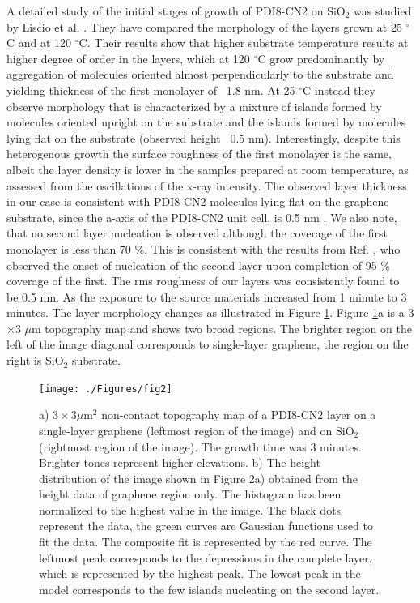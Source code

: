 \documentclass[preprint,aip,jap]{revtex4-2}
\begin{document}
 
A detailed study of the initial stages of growth of PDI8-CN2 on SiO$_{2}$ was studied by Liscio et al.
\cite{liscio-2013}.
 They have compared the morphology of the layers grown at 25 $^\circ$C and at 120 $^\circ$C.
 Their results show that higher substrate temperature results at higher degree of order in the layers, which at 120 $^\circ$C grow predominantly by aggregation of molecules oriented almost perpendicularly to the substrate and yielding thickness of the first monolayer of ~1.8 nm.
 At 25 $^\circ$C instead they observe morphology that is characterized by a mixture of islands formed by molecules oriented upright on the substrate and the islands formed by molecules lying flat on the substrate (observed height ~0.5 nm).
 Interestingly, despite this heterogenous growth the surface roughness of the first monolayer is the same, albeit the layer density is lower in the samples prepared at room temperature, as assessed from the oscillations of the x-ray intensity.
The observed layer thickness in our case is consistent with PDI8-CN2 molecules lying flat on the graphene substrate, since the a-axis of the PDI8-CN2 unit cell, is 0.5 nm \cite{liscio-2012}.
 We also note, that no second layer nucleation is observed although the coverage of the first monolayer is less than 70 \%.
 This is consistent with the results from Ref.
 , who observed the onset of nucleation of the second layer upon completion of 95 \% coverage of the first.
 The rms roughness of our layers was consistently found to be 0.5 nm.
 As the exposure to the source materials increased from 1 minute to 3 minutes.
 The layer morphology changes as illustrated in Figure \ref{fig:2}.
 Figure \ref{fig:2}a is a  3$\times$3 $\mu$m topography map and shows two broad regions.
 The brighter region on the left of the image diagonal corresponds to single-layer graphene, the region on the right is SiO$_{2}$ substrate.
 
\begin{figure}[htb]
  \centering
   \texttt{[image: ./Figures/fig2]}
  \caption{a) $3\times3 \mu$m$^{2}$ non-contact topography map of a PDI8-CN2 layer on a single-layer graphene (leftmost region of the image) and on SiO$_{2}$ (rightmost region of the image).
 The growth time was 3 minutes.
 Brighter tones represent higher elevations.
 b) The height distribution of the image shown in Figure 2a) obtained from the height data of graphene region only.
 The histogram has been normalized to the highest value in the image.
 The black dots represent the data, the green curves are Gaussian functions used to fit the data.
 The composite fit is represented by the red curve.
  The leftmost peak corresponds to the depressions in the complete layer, which is represented by the highest peak.
 The lowest peak in the model corresponds to the few islands nucleating on the second layer.
}  \label{fig:2}
\end{figure}
\end{document}
